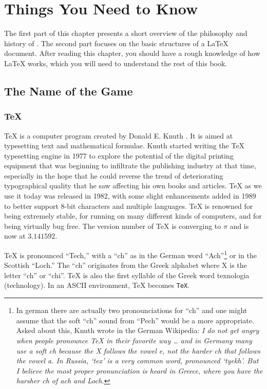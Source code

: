  
\chapter{Things You Need to Know}
\begin{intro}
The first part of this chapter presents a short 
overview of the philosophy and history of \LaTeXe. The second part
focuses on the basic structures of a \LaTeX{} document. 
After reading this chapter, you should have a rough knowledge
of how \LaTeX{} works, which you will need to understand the rest
of this book.  
\end{intro}

\section{The Name of the Game}
\subsection{\TeX}
 
\TeX{} is a computer program created by Donald
E. Knuth \cite{texbook}. It is aimed at typesetting text and
mathematical formulae. Knuth started writing the \TeX{} typesetting
engine in 1977 to explore the potential of the digital printing
equipment that was beginning to infiltrate the publishing industry at
that time, especially in the hope that he could reverse the trend of
deteriorating typographical quality that he saw affecting his own
books and articles. \TeX{} as we use it today was released in 1982,
with some slight enhancements added in 1989 to better support 8-bit
characters and multiple languages. \TeX{} is renowned for being
extremely stable, for running on many different kinds of computers,
and for being virtually bug free. The version number of \TeX{} is
converging to $\pi$ and is now at $3.141592$.
                                                                       
\TeX{} is pronounced ``Tech,'' with a ``ch'' as in the German word
``Ach''\footnote{In german there are actually two pronounciations for ``ch''
and one might assume that the soft ``ch'' sound from ``Pech'' would be a
more appropriate. Asked about this, Knuth wrote in the German Wikipedia:
\emph{I do not get angry when people pronounce \TeX{} in their favorite way
\ldots{} and in Germany many use a soft ch because the X follows the vowel
e, not the harder ch that follows the vowel a. In Russia, `tex' is a very
common word, pronounced `tyekh'. But I believe the most proper pronunciation
is heard in Greece, where you have the harsher ch of ach and Loch.}}
or in the Scottish ``Loch.'' The ``ch'' originates from the Greek
alphabet where X is the letter ``ch'' or ``chi''. \TeX{} is also the first syllable
of the Greek word texnologia (technology). In an ASCII environment, \TeX{}
becomes \texttt{TeX}.

